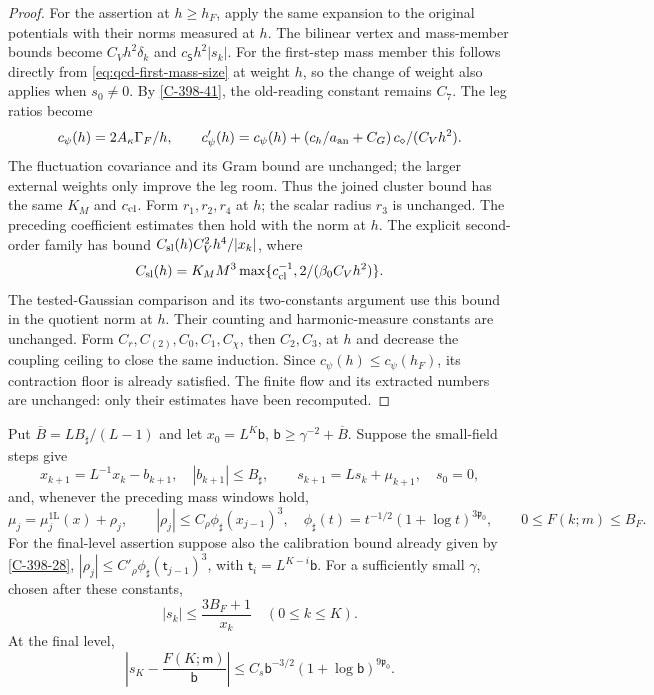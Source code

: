 \documentclass[11pt,letterpaper,reqno]{amsart}
\makeatletter
\theoremstyle{definition}
\newcommand{\ms@minorstart}{%
  \pushQED{\qed}\renewcommand{\qedsymbol}{$\blacksquare$}}
\newenvironment{proposition}[1][]{\ms@minorstart\ms@proposition[#1]}
  {\popQED\endms@proposition}
\theoremstyle{remark}
\makeatother
\begin{document}
\begin{proof}
For the assertion at $h\ge h_F$, apply the same expansion to
the original potentials with their norms measured at $h$.
The bilinear vertex and mass-member bounds become
$C_Vh^2\delta_k$ and $c_{\mathsf S}h^2|s_k|$.
For the first-step mass member this follows directly from
\eqref{eq:qcd-first-mass-size} at weight $h$, so the change of
weight also applies when $s_0\ne0$.
By \cref{C-398-41}, the old-reading constant remains $C_7$.
The leg ratios become
\[
 c_\psi(h)=2A_\kappa\Gamma_F/h,\qquad
 c'_\psi(h)=c_\psi(h)+
 \left(c_h/a_{\rm an}+C_G\right)c_\diamond/(C_Vh^2).
\]
The fluctuation covariance and its Gram bound are unchanged;
the larger external weights only improve the leg room.
Thus the joined cluster bound has the same $K_M$ and
$c_{\rm cl}$. Form $r_1,r_2,r_4$ at $h$; the scalar radius
$r_3$ is unchanged. The preceding coefficient estimates then
hold with the norm at $h$. The explicit second-order family
has bound $C_{\rm sl}(h)C_V^2h^4/|x_k|$, where
\[
 C_{\rm sl}(h)=K_MM^3
       \max\{c_{\rm cl}^{-1},2/(\beta_0C_Vh^2)\}.
\]
The tested-Gaussian comparison and its two-constants argument
use this bound in the quotient norm at $h$. Their counting
and harmonic-measure constants are unchanged. Form
$C_r,C_{(2)},C_0,C_1,C_\chi$, then $C_2,C_3$, at $h$ and
decrease the coupling ceiling to close the same induction.
Since $c_\psi(h)\le c_\psi(h_F)$, its contraction floor is
already satisfied. The finite flow and its extracted numbers
are unchanged: only their estimates have been recomputed.
\end{proof}

\begin{proposition}[Closing the forward mass flow]\label{C-396-33}
Put $\overline B=LB_\sharp/(L-1)$ and let
$x_0=L^K\mathsf b$, $\mathsf b\ge\gamma^{-2}+\overline B$.
Suppose the small-field steps give
\[
 x_{k+1}=L^{-1}x_k-b_{k+1},\quad |b_{k+1}|\le B_\sharp,
 \qquad s_{k+1}=Ls_k+\mu_{k+1},\quad s_0=0,
\]
and, whenever the preceding mass windows hold,
\[
 \mu_j=\mu_j^{\mathrm{1L}}(x)+\rho_j,\qquad
 |\rho_j|\le C_\rho\phi_\sharp(x_{j-1})^3,
 \quad \phi_\sharp(t)=t^{-1/2}(1+\log t)^{3\mathfrak p_0},
 \qquad 0\le F(k;m)\le B_F.
\]
For the final-level assertion suppose also the calibration
bound already given by \cref{C-398-28},
$|\rho_j|\le C'_\rho\phi_\sharp(\mathsf t_{j-1})^3$, with
$\mathsf t_i=L^{K-i}\mathsf b$. For a sufficiently small $\gamma$, chosen
after these constants,
\[
 |s_k|\le\frac{3B_F+1}{x_k}\quad(0\le k\le K).
\]
At the final level,
\[
 \left|s_K-\frac{F(K;\mathsf m)}{\mathsf b}\right|
 \le C_s\mathsf b^{-3/2}(1+\log\mathsf b)^{9\mathfrak p_0}.
\]
\end{proposition}
\end{document}

